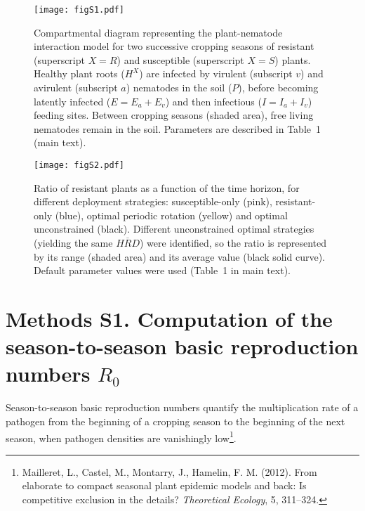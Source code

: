 \begin{figure}[p]
  \centering
  \texttt{[image: figS1.pdf]}
  \caption[Plant-nematode interaction model for two successive cropping
    seasons of resistant  and susceptible
    plants]{Compartmental diagram representing the
    plant-nematode interaction model for two successive cropping
    seasons of resistant (superscript $X=R$) and susceptible
    (superscript $X=S$) plants. Healthy plant roots ($H^X$) are
    infected by virulent (subscript $v$) and avirulent (subscript $a$)
    nematodes in the soil ($P$), before becoming latently infected
    ($E=E_a +E_v$) and then infectious ($I=I_a + I_v$) feeding
    sites. Between cropping seasons (shaded area), free living
      nematodes remain in the soil. Parameters are described in Table~1 (main text).}
  \label{figS1}
\end{figure}

\begin{figure}[p]
  \centering
  \texttt{[image: figS2.pdf]}
  \caption[Ratio of resistant plants as a function of the time
    horizon, for different deployment strategies]{Ratio of resistant plants as a function of the time
    horizon, for different deployment strategies: susceptible-only
    (pink), resistant-only (blue), optimal periodic rotation (yellow)
    and optimal unconstrained (black). Different unconstrained optimal
    strategies (yielding the same $\overline{HRD}$) were identified,
    so the ratio is represented by its range (shaded area) and its
    average value (black solid curve). Default parameter values were
    used (Table~1 in main text).}
  \label{figS2}
\end{figure}



\clearpage
\section{Methods S1. Computation of the season-to-season basic reproduction numbers $R_0$} 

Season-to-season basic reproduction numbers quantify the multiplication rate of a pathogen from the beginning of a cropping season to the beginning of the next season, when pathogen densities are vanishingly low\footnote{Mailleret, L., Castel, M., Montarry, J., Hamelin, F. M. (2012). From elaborate to compact seasonal plant epidemic models and back: Is competitive exclusion in the details? \emph{Theoretical Ecology}, 5, 311--324.}.

